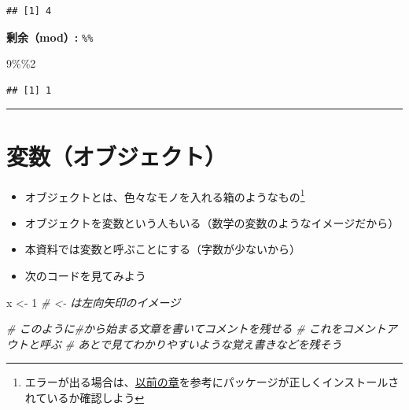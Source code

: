 \documentclass[
]{book}
\newenvironment{Shaded}{\begin{snugshade}}{\end{snugshade}}
\newcommand{\CommentTok}[1]{\textcolor[rgb]{0.56,0.35,0.01}{\textit{#1}}}
\newcommand{\DecValTok}[1]{\textcolor[rgb]{0.00,0.00,0.81}{#1}}
\newcommand{\NormalTok}[1]{#1}
\newcommand{\OtherTok}[1]{\textcolor[rgb]{0.56,0.35,0.01}{#1}}
\newcommand{\SpecialCharTok}[1]{\textcolor[rgb]{0.00,0.00,0.00}{#1}}
\begin{document}
\begin{verbatim}
## [1] 4
\end{verbatim}

\textbf{剰余（mod）:} \texttt{\%\%}

\begin{Shaded}
\begin{Highlighting}[]
\DecValTok{9}\SpecialCharTok{\%\%}\DecValTok{2}
\end{Highlighting}
\end{Shaded}

\begin{verbatim}
## [1] 1
\end{verbatim}

\begin{center}\rule{0.5\linewidth}{0.5pt}\end{center}

\hypertarget{ux5909ux6570ux30aaux30d6ux30b8ux30a7ux30afux30c8}{%
\section{変数（オブジェクト）}\label{ux5909ux6570ux30aaux30d6ux30b8ux30a7ux30afux30c8}}

\begin{itemize}
\item
  オブジェクトとは、色々なモノを入れる箱のようなもの\footnote{エラーが出る場合は、\protect\hyperlink{ux30d1ux30c3ux30b1ux30fcux30b8ux306eux30a4ux30f3ux30b9ux30c8ux30fcux30eb}{以前の章}を参考にパッケージが正しくインストールされているか確認しよう}\\
\item
  オブジェクトを変数という人もいる（数学の変数のようなイメージだから）
\item
  本資料では変数と呼ぶことにする（字数が少ないから）
\item
  次のコードを見てみよう
\end{itemize}

\begin{Shaded}
\begin{Highlighting}[]
\NormalTok{x }\OtherTok{\textless{}{-}} \DecValTok{1} \CommentTok{\# \textless{}{-} は左向矢印のイメージ}

\CommentTok{\# このように\#から始まる文章を書いてコメントを残せる}
\CommentTok{\# これをコメントアウトと呼ぶ}
\CommentTok{\# あとで見てわかりやすいような覚え書きなどを残そう}
\end{Highlighting}
\end{Shaded}
\end{document}
